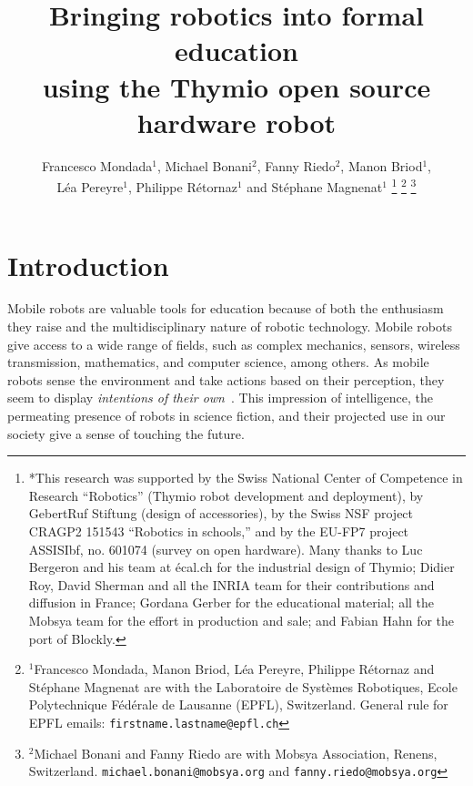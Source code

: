 \documentclass[letterpaper, 10 pt, conference]{ieeeconf}  %
\title{\LARGE \bf
Bringing robotics into formal education \\
using the Thymio open source hardware robot
}
\author{Francesco Mondada$^{1}$, Michael Bonani$^{2}$, Fanny Riedo$^{2}$, Manon Briod$^{1}$, \\
L\'ea Pereyre$^{1}$, Philippe R\'etornaz$^{1}$ and St\'ephane Magnenat$^{1}$%
\thanks{*This research was supported by the Swiss National Center of Competence in Research ``Robotics'' (Thymio robot development and deployment), by GebertRuf Stiftung (design of accessories), by the Swiss NSF project CRAGP2 151543 ``Robotics in schools,'' and by the EU-FP7 project ASSISIbf, no. 601074 (survey on open hardware).
Many thanks to Luc Bergeron and his team at \'ecal.ch for the industrial design of Thymio; Didier Roy, David Sherman and all the INRIA team for their contributions and diffusion in France; Gordana Gerber for the educational material; all the Mobsya team for the effort in production and sale; and Fabian Hahn for the port of Blockly.}%
\thanks{$^{1}$Francesco Mondada, Manon Briod, L\'ea Pereyre, Philippe R\'etornaz and St\'ephane Magnenat are with the Laboratoire de Syst\`emes Robotiques,
        Ecole Polytechnique F\'ed\'erale de Lausanne (EPFL), Switzerland.
        {General rule for EPFL emails: \tt\small firstname.lastname@epfl.ch}}%
\thanks{$^{2}$Michael Bonani and Fanny Riedo are with Mobsya Association, Renens, Switzerland.
        {\tt\small michael.bonani@mobsya.org} and {\tt\small fanny.riedo@mobsya.org}}%
}
\begin{document}
\maketitle
\thispagestyle{empty}
\pagestyle{empty}





\section{Introduction}

Mobile robots are valuable tools for education because of both the enthusiasm they raise and the multidisciplinary nature of robotic technology.
Mobile robots give access to a wide range of fields, such as complex mechanics, sensors, wireless transmission, mathematics, and computer science, among others.
As mobile robots sense the environment and take actions based on their perception, they seem to display \emph{intentions of their own}~\cite{Mondada2001}.
This impression of intelligence, the permeating presence of robots in science fiction, and their projected use in our society give a sense of touching the future.
\end{document}
